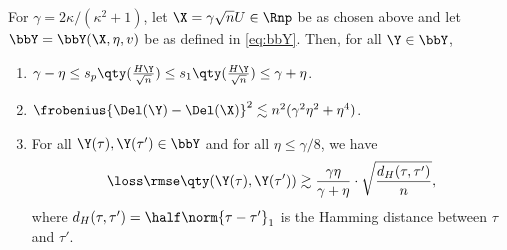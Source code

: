 \documentclass[10pt]{article}
\begin{document}
\begin{lemma}\label{lemma:Y-subset-X}
    For $\gamma = 2\kappa / (\kappa^2 + 1)$, let $\X = \gamma\sqrt{n} U \in \Rnp$ be as chosen above and let $\bbY = \bbY(\X, \eta, v)$ be as defined in \cref{eq:bbY}. Then, for all $\Y \in \bbY$,
    \begin{enumerate}[label=\textup{(\roman*)}, ref=\cref{lemma:Y-subset-X}~(\roman*)]
        \item\label{eq:sY-bound} $\gamma - \eta \le s_p\qty(\frac{H\Y}{\sqrt{n}}) \le s_1\qty(\frac{H\Y}{\sqrt{n}}) \le \gamma + \eta$.
        \item\label{eq:DelY-bound} $\frobenius{\Del(\Y) - \Del(\X)}^2 \lesssim n^2( \gamma^2\eta^2 + \eta^4 )$.
        \item\label{eq:Y-separation} For all $\Y(\tau), \Y(\tau') \in \bbY$ and for all $\eta \le \gamma/8$, we have $$
        \loss\rmse\qty(\Y(\tau), \Y(\tau')) \gtrsim \frac{\gamma\eta}{\gamma + \eta} \cdot \sqrt{\frac{d_H(\tau, \tau')}{n}},$$ 
        where $d_H(\tau, \tau') = \half\norm{\tau - \tau'}_1$ is the Hamming distance between $\tau$ and $\tau'$.
    \end{enumerate}
\end{lemma}
\end{document}

